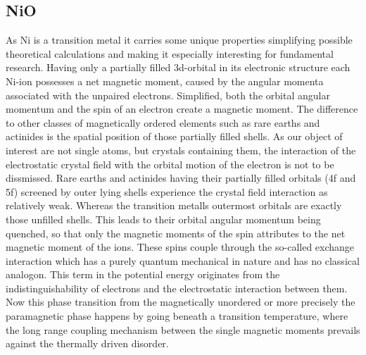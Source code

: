 \subsection{NiO}
As Ni is a transition metal it carries some unique properties simplifying possible theoretical calculations and making it especially interesting for fundamental research.
Having only a partially filled 3d-orbital in its electronic structure each Ni-ion possesses a net magnetic moment, caused by the angular momenta associated with the unpaired electrons.
Simplified, both the orbital angular momentum and the spin of an electron create a magnetic moment.
The difference to other classes of magnetically ordered elements such as rare earths and actinides is the spatial position of those partially filled shells.
As our object of interest are not single atoms, but crystals containing them, the interaction of the electrostatic crystal field with the orbital motion of the electron is not to be dissmissed.
Rare earths and actinides having their partially filled orbitals (4f and 5f) screened by outer lying shells experience the crystal field interaction as relatively weak.
Whereas the transition metalls outermost orbitals are exactly those unfilled shells.
This leads to their orbital angular momentum being quenched, so that only the magnetic moments of the spin attributes to the net magnetic moment of the ions.
These spins couple through the so-called exchange interaction which has a purely quantum mechanical in nature and has no classical analogon.
This term in the potential energy originates from the indistinguishability of electrons and the electrostatic interaction between them.
Now this phase transition from the magnetically unordered or more precisely the paramagnetic phase happens by going beneath a transition temperature, where the long range coupling mechanism between the single magnetic moments prevails against the thermally driven disorder.


